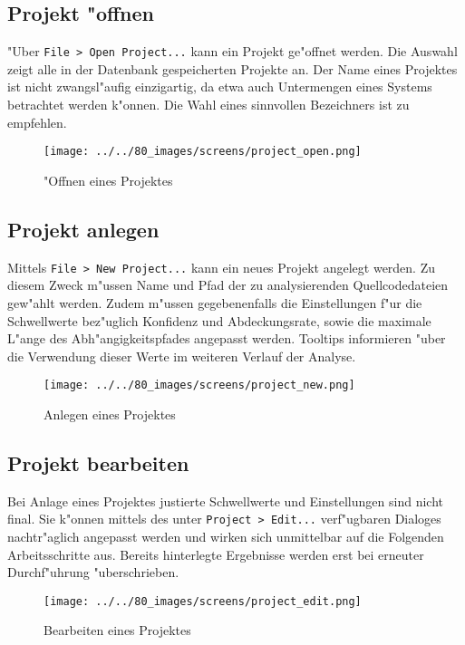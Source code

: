 \documentclass{proc}
\begin{document}
	\subsection{Projekt "offnen}
	
	"Uber \texttt{File > Open Project...} kann ein Projekt ge"offnet werden.
	Die Auswahl zeigt alle in der Datenbank gespeicherten Projekte an.
	Der Name eines Projektes ist nicht zwangsl"aufig einzigartig, da etwa auch Untermengen eines Systems betrachtet werden k"onnen.
	Die Wahl eines sinnvollen Bezeichners ist zu empfehlen.
	
	\begin{figure}[h!]
		\centering
		\caption{"Offnen eines Projektes}
		\texttt{[image: ../../80\_images/screens/project\_open.png]}
	\end{figure}
		
	\subsection{Projekt anlegen}
	
	Mittels \texttt{File > New Project...} kann ein neues Projekt angelegt werden.
	Zu diesem Zweck m"ussen Name und Pfad der zu analysierenden Quellcodedateien gew"ahlt werden.
	Zudem m"ussen gegebenenfalls die Einstellungen f"ur die Schwellwerte bez"uglich Konfidenz und Abdeckungsrate, sowie die maximale L"ange des Abh"angigkeitspfades angepasst werden.
	Tooltips informieren "uber die Verwendung dieser Werte im weiteren Verlauf der Analyse.
	
	\begin{figure}[h!]
		\centering
		\caption{Anlegen eines Projektes}
		\texttt{[image: ../../80\_images/screens/project\_new.png]}
	\end{figure}
	
	\subsection{Projekt bearbeiten}
	
	Bei Anlage eines Projektes justierte Schwellwerte und Einstellungen sind nicht final.
	Sie k"onnen mittels des unter \texttt{Project > Edit...} verf"ugbaren Dialoges nachtr"aglich angepasst werden und wirken sich unmittelbar auf die Folgenden Arbeitsschritte aus.
	Bereits hinterlegte Ergebnisse werden erst bei erneuter Durchf"uhrung "uberschrieben.
	
	\begin{figure}[h!]
		\centering
		\caption{Bearbeiten eines Projektes}
		\texttt{[image: ../../80\_images/screens/project\_edit.png]}
	\end{figure}
	
\end{document}
